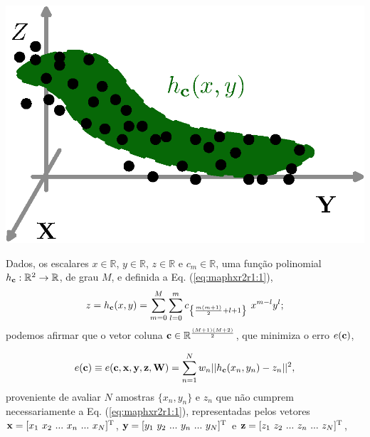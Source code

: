 \begin{theorem}
\label{theo:maphxr2r1}
~\\
\begin{minipage}{0.4\textwidth}
\centering
\includegraphics[width=0.95\linewidth]{chapters/mapeamento/mapeamento-hx2.eps} 
\end{minipage}
\begin{minipage}{0.6\textwidth}
Dados,
os escalares $x \in \mathbb{R}$, $y \in \mathbb{R}$, $z \in \mathbb{R}$ e $c_m \in \mathbb{R}$,
uma função polinomial $h_{\VECTOR{c}}:\mathbb{R}^2 \rightarrow \mathbb{R}$, de grau $M$, e 
definida a Eq. (\ref{eq:maphxr2r1:1}),
\begin{equation}\label{eq:maphxr2r1:1}
z= h_{\VECTOR{c}}(x,y) = \sum \limits_{m=0}^{M} \sum \limits_{l=0}^{m}c_{\left\{ \frac{m(m+1)}{2}+l+1\right\}}~x^{m-l}y^{l}; 
\end{equation}
podemos afirmar que o vetor coluna $\VECTOR{c} \in \mathbb{R}^{\frac{(M+1)(M+2)}{2}}$,
que minimiza o erro $e(\VECTOR{c})$,
\end{minipage}
\begin{equation}\label{eq:maphxr2r1:2}
e(\VECTOR{c}) \equiv e(\VECTOR{c},\VECTOR{x},\VECTOR{y},\VECTOR{z},\MATRIX{w})=  \sum_{n=1}^{N} w_n||h_{\VECTOR{c}}(x_n,y_n)-z_n||^2,
\end{equation}
proveniente de avaliar $N$ amostras $\{x_n,y_n\}$ e $z_n$ que não cumprem necessariamente a Eq. (\ref{eq:maphxr2r1:1}), 
representadas pelos vetores 
$\VECTOR{x}=[x_1~ x_2~ ...~ x_n~ ...~ x_N]^{\transpose}$,
$\VECTOR{y}=[y_1~ y_2~ ...~ y_n~ ...~ y_N]^{\transpose}$ e 
$\VECTOR{z}=[z_1~ z_2~ ...~ z_n~ ...~ z_N]^{\transpose}$,

\end{theorem}
